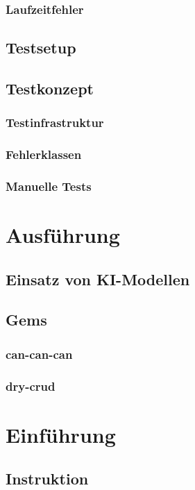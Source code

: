 \subsection{Laufzeitfehler}

\section{Testsetup}

\section{Testkonzept}
\subsection{Testinfrastruktur}
\subsection{Fehlerklassen}
\subsection{Manuelle Tests}

\chapter{Ausführung}
\section{Einsatz von KI-Modellen}
\section{Gems}
\subsection{can-can-can}
\subsection{dry-crud}

\chapter{Einführung}
\section{Instruktion}

